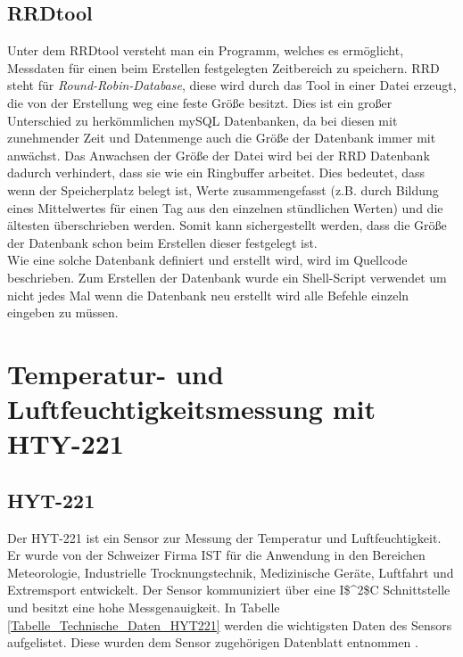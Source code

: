 \subsection*{RRDtool}
Unter dem RRDtool versteht man ein Programm, welches es ermöglicht, Messdaten für einen beim Erstellen festgelegten Zeitbereich zu speichern. RRD steht für \textit{Round-Robin-Database}, diese wird durch das Tool in einer Datei erzeugt, die von der Erstellung weg eine feste Größe besitzt. Dies ist ein großer Unterschied zu herkömmlichen mySQL Datenbanken, da bei diesen mit zunehmender Zeit und Datenmenge auch die Größe der Datenbank immer mit anwächst. Das Anwachsen der Größe der Datei wird bei der RRD Datenbank dadurch verhindert, dass sie wie ein Ringbuffer arbeitet. Dies bedeutet, dass wenn der Speicherplatz belegt ist, Werte zusammengefasst (z.B. durch Bildung eines Mittelwertes für einen Tag aus den einzelnen stündlichen Werten) und die ältesten überschrieben werden. Somit kann sichergestellt werden, dass die Größe der Datenbank schon beim Erstellen dieser festgelegt ist.\\
Wie eine solche Datenbank definiert und erstellt wird, wird im Quellcode beschrieben. Zum Erstellen der Datenbank wurde ein Shell-Script verwendet um nicht jedes Mal wenn die Datenbank neu erstellt wird alle Befehle einzeln eingeben zu müssen.


















\newpage
\section{Temperatur- und Luftfeuchtigkeitsmessung mit HTY-221}
\label{section_HTY221}

\subsection{HYT-221}
\label{subsection_HYT221}
Der HYT-221 ist ein Sensor zur Messung der Temperatur und Luftfeuchtigkeit. Er wurde von der Schweizer Firma \ac{IST} für die Anwendung in den Bereichen Meteorologie, Industrielle Trocknungstechnik, Medizinische Geräte, Luftfahrt und Extremsport entwickelt. Der Sensor kommuniziert über eine \ac{I$^2$C} Schnittstelle und besitzt eine hohe Messgenauigkeit. In Tabelle \ref{Tabelle_Technische_Daten_HYT221}  werden die wichtigsten Daten des Sensors aufgelistet. Diese wurden dem Sensor zugehörigen Datenblatt entnommen \citep{Datenblatt_HYT221}.

